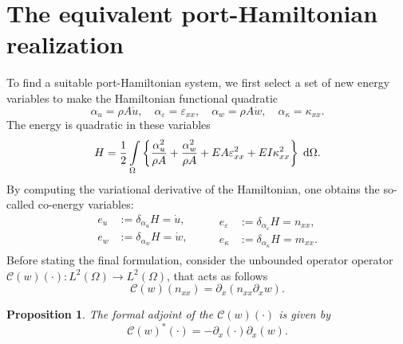 \documentclass{ifacconf}
\newtheorem{proposition}{Proposition}
\begin{document}
\section{The equivalent port-Hamiltonian realization}
To find a suitable port-Hamiltonian system, we first select a set of new energy variables to make the Hamiltonian functional quadratic
\begin{equation}
	\alpha_u = \rho A \dot{u}, \quad \alpha_\varepsilon = \varepsilon_{xx}, \quad \alpha_w = \rho A \dot{w}, \quad \alpha_\kappa = \kappa_{xx}.
\end{equation}
The energy is quadratic in these variables
\begin{equation}
	H = \frac{1}{2} \int_{\Omega} \left\{\frac{\alpha_u^2}{\rho A} + \frac{\alpha_w^2}{\rho A} + EA \varepsilon_{xx}^2 + EI \kappa_{xx}^2 \right\} \d{\Omega}.
\end{equation}
By computing the variational derivative of the Hamiltonian, one obtains the so-called co-energy variables:
\begin{equation}
	\begin{aligned}
	e_u &:= \delta_{\alpha_u} H = \dot{u}, \\
	e_w &:= \delta_{\alpha_w} H = \dot{w}, \\
	\end{aligned} \qquad 
\begin{aligned}
	e_\varepsilon &:= \delta_{\alpha_\varepsilon} H = n_{xx}, \\ e_\kappa &:= \delta_{\alpha_\kappa} H = m_{xx}.
\end{aligned}
\end{equation}
Before stating the final formulation, consider the unbounded operator operator $\mathcal{C}(w)(\cdot): L^2(\Omega) \rightarrow L^2(\Omega)$, that acts as follows
\begin{equation}
	\mathcal{C}(w)(n_{xx}) = \partial_x(n_{xx} \partial_x w).
\end{equation}
\begin{proposition}\label{prop:adjC}
	The formal adjoint of the $\mathcal{C}(w)(\cdot)$ is given by
	\begin{equation}
		\mathcal{C}(w)^*(\cdot) = -\partial_x (\cdot) \partial_x(w).
	\end{equation}
\end{proposition}
\end{document}
